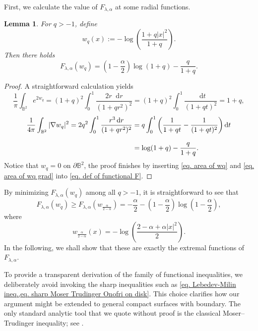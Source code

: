 \documentclass[11pt,a4paper,twoside]{amsart}
\newtheorem{lemma}[theorem]{Lemma}
\newtheorem{sketch proof}{Sketch of the proof}[section]
\newcommand{\dd}{\mathop{}\!\mathrm{d}}
\begin{document}
    First, we calculate the value of $F_{\lambda,\alpha}$ at some radial functions.
    \begin{lemma}\label{lem. F of wq}
        For $q>-1$, define
        \begin{equation}\label{eq. def of wq}
            w_q(x):=-\log
        \left(\frac{1+q|x|^2}{1+q}\right).
        \end{equation}
        Then there holds
        \[
         F_{\lambda,\alpha}(w_q)
        =\left(1-\frac{\alpha}{2}\right)
        \log(1+q)
        -\frac{q}{1+q}.
        \]
    \end{lemma}
    \begin{proof}
        A straightforward calculation yields
        \begin{equation}\label{eq. area of wq}
            \frac{1}{\pi}\int_{\mathbb{B}^2}e^{2w_q}
        =(1+q)^2\int_0^1\frac{2r\dd r}{(1+qr^2)^2}
        =(1+q)^2\int_0^1\frac{\dd t}{(1+qt)^2}
        =1+q,
        \end{equation}
        \begin{align}\label{eq. area of wq grad}
            \frac{1}{4\pi}
        \int_{\mathbb{B}^2}|\nabla w_{q}|^2
        =2q^2\int_0^1\frac{r^3\dd r}{(1+qr^2)^2}
        &=q\int_0^1
        \left(\frac{1}{1+qt}-\frac{1}{(1+qt)^2}\right)\dd t\\[3mm]
        &
        =\log(1+q)-\frac{q}{1+q}\notag.
        \end{align}
        Notice that $w_q=0$ on $\partial\mathbb{B}^2$, the proof finishes by inserting \cref{eq. area of wq} and \cref{eq. area of wq grad} into \cref{eq. def of functional F}.
    \end{proof}
\vspace{1em}

    By minimizing $F_{\lambda,\alpha}(w_q)$ among all $q>-1$, it is straightforward to see that
    \[
    F_{\lambda,\alpha}(w_q)
    \geq F_{\lambda,\alpha}(w_{\frac{\alpha}{2-\alpha}})
    =-\frac{\alpha}{2}
        -\left(1-\frac{\alpha}{2}\right)
        \log\left(1-\frac{\alpha}{2}\right),
    \]
    where 
    \[
    w_{\frac{\alpha}{2-\alpha}}(x)
    =-\log 
    \left(\frac{2-\alpha+\alpha|x|^2}{2}\right).
    \]
    In the following, we shall show that these are exactly the extremal functions of $F_{\lambda,\alpha}$.
\vspace{1em}

    To provide a transparent derivation of the family of functional inequalities, we deliberately avoid invoking the sharp inequalities such as \cref{eq. Lebedev-Milin ineq.,eq. sharp Moser Trudinger Onofri on disk}. This choice clarifies how our argument might be extended to general compact surfaces with boundary. The only standard analytic tool that we quote without proof is the classical Moser--Trudinger inequality; see \cite{Mos71}.
    
\end{document}
